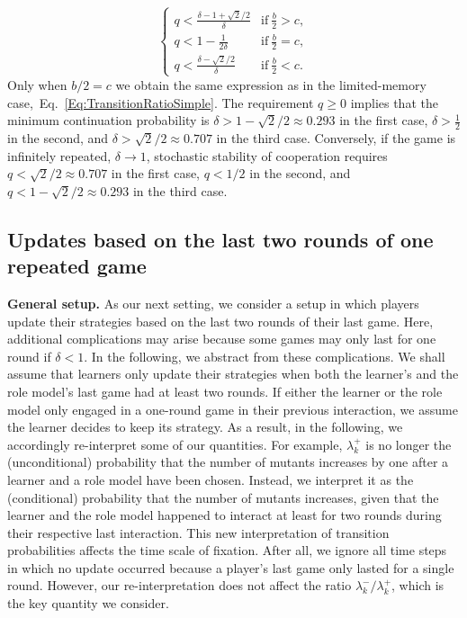 \documentclass[11pt]{article}
\theoremstyle{plainCl1}
\theoremstyle{plainCl2}
\begin{document}
\begin{equation} \label{Eq:Condition_TwoGames}
\begin{cases}
  q <\frac{\delta - 1 + \sqrt{2}/2}{\delta}	&\text{if}~ \frac{b}{2} > c , \\[0.15cm]
  q<1-\frac{1}{2\delta}	&\text{if}~\frac{b}{2}=c , \\[0.15cm]
  q <\frac{\delta - \sqrt{2}/2}{\delta}\ &\text{if}~\frac{b}{2} < c .
\end{cases}
\end{equation}
Only when \(b/2\!=\!c\) we obtain the same expression as in the limited-memory case,~Eq.~\eqref{Eq:TransitionRatioSimple}. 
The requirement $q\!\ge\!0$ implies that the minimum continuation probability is $\delta\!>\!1\!-\!\sqrt{2}/2\approx 0.293$ in the first case, $\delta\!>\!\frac{1}{2}$ in the second, and $\delta>\sqrt{2}/2\approx 0.707$ in the third case. 
Conversely, if the game is infinitely repeated, $\delta\!\rightarrow\!1$, stochastic stability of cooperation requires $q<\sqrt{2}/2\approx 0.707$ in the first case, $q<1/2$ in the second, and $q<1\!-\!\sqrt{2}/2\approx 0.293$ in the third case. 




\subsection{Updates based on the last two rounds of one repeated game}
\label{section:m_two_n_one}


{\bf General setup.} As our next setting, we consider a setup in which players update their strategies based on the last two rounds of their last game. 
Here, additional complications may arise because some games may only last for one round if $\delta\!<\!1$.
In the following, we abstract from these complications.  
We shall assume that learners only update their strategies when both the learner's and the role model's last game had at least two rounds. 
If either the learner or the role model only engaged in a one-round game in their previous interaction, we assume the learner decides to keep its strategy. 
As a result, in the following, we accordingly re-interpret some of our quantities. 
For example, $\lambda^+_k$ is no longer the (unconditional) probability that the number of mutants increases by one after a learner and a role model have been chosen.
Instead, we interpret it as the (conditional) probability that the number of mutants increases, given that the learner and the role model happened to interact at least for two rounds during their respective last interaction. 
This new interpretation of transition probabilities affects the time scale of fixation. 
After all, we ignore all time steps in which no update occurred because a player's last game only lasted for a single round.
However, our re-interpretation does not affect the ratio $\lambda^-_k/\lambda^+_k$, which is the key quantity we consider.\\ 
\end{document}
